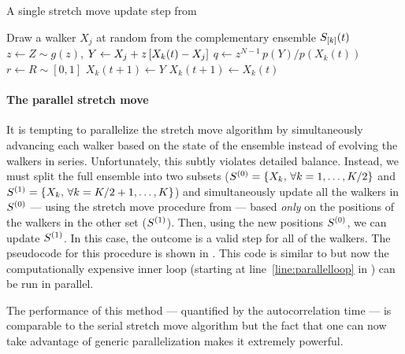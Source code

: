 \begin{algorithm}
\caption{A single stretch move update step from 
    }
\begin{algorithmic}[1]
    \STATE Draw a walker $X_j$ at random from the complementary ensemble %
        $S_{[k]}(t)$
    \STATE $z \gets Z \sim g(z)$, 
    \STATE $\vector{Y} \gets \vector{X_j} %
                + z \, [ \vector{X_k} (t) - \vector{X_j}]$
    \STATE $q \gets z^{N-1} \, p(Y)/p(X_k(t))$ \label{line:hard}%
        \hspace{1cm}{\footnotesize\it // This line is generally expensive}
    \STATE $r \gets R \sim [0, 1]$
        \STATE $X_k(t+1) \gets Y$
    \ELSE
        \STATE $X_k(t+1) \gets X_k(t)$
    \ENDIF
\ENDFOR
\end{algorithmic}
\end{algorithm}

\paragraph{The parallel stretch move}

It is tempting to parallelize the stretch move algorithm by
simultaneously advancing each walker based on the state of the ensemble
instead of evolving the walkers in series. Unfortunately, this subtly
violates detailed balance. Instead, we must split the full ensemble
into two subsets
($S^{(0)} = \{ X_k, \, \forall k = 1, \ldots, K/2 \}$ and
$S^{(1)} = \{ X_k, \, \forall k = K/2+1, \ldots, K \}$) and
simultaneously update all the walkers in $S^{(0)}$
--- using the stretch move procedure from  ---
based \emph{only} on the positions of the walkers in the other set
($S^{(1)}$). Then, using the new positions $S^{(0)}$,
we can update $S^{(1)}$. In this case, the outcome is a valid step
for all of the walkers. The pseudocode for
this procedure is shown in . This code is similar to
 but now the computationally expensive inner loop
(starting at line~\ref{line:parallelloop} in ) can be run in
parallel.

The performance of this method --- quantified by the autocorrelation time ---
is comparable to the serial stretch move algorithm but the fact that one
can now take advantage of generic parallelization makes it
extremely powerful.

